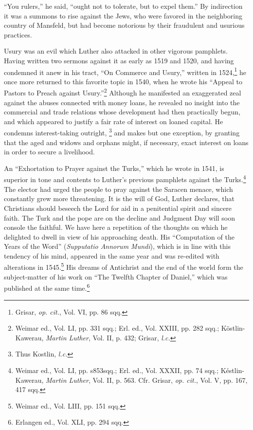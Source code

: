 “You rulers,” he said,
“ought not to tolerate, but to expel them.” By indirection it was a
summons to rise against the Jews, who were favored in the neighboring
country of Mansfeld, but had become notorious by their fraudulent
and usurious practices.

Usury was an evil which Luther also attacked in other vigorous
pamphlets. Having written two sermons against it as early as 1519
and 1520, and having condemned it anew in his tract, “On Commerce
and Usury,” written in 1524,\footnote{Grisar, \textit{op. cit.}, Vol. VI, pp. 86 sqq.}
he once more returned to this
favorite topic in 1540, when he wrote his “Appeal to Pastors to
Preach against Usury.”\footnote
{Weimar ed., Vol. LI, pp. 331 sqq.; Erl. ed., Vol. XXIII, pp. 282 sqq.; Köstlin-Kawerau,
\textit{Martin Luther}, Vol. II, p. 432; Grisar, \textit{l.c.}}
Although he manifested an exaggerated
zeal against the abuses connected with money loans, he revealed no
insight into the commercial and trade relations whose development
had then practically begun, and which appeared to justify a fair rate
of interest on loaned capital. He condemns interest-taking outright,
\footnote{Thus Kostlin, \textit{l.c.}}
and makes but one exception, by granting that the aged and widows
and orphans might, if necessary, exact interest on loans in order to
secure a livelihood.

An “Exhortation to Prayer against the Turks,” which he wrote in
1541, is superior in tone and contents to Luther’s previous pamphlets
against the Turks.\footnote
{Weimar ed., Vol. LI, pp. s853sqq.; Erl. ed., Vol. XXXII, pp. 74 sqq.; Késtlin-Kawerau,
\textit{Martin Luther}, Vol. II, p. 563. Cfr. Grisar, \textit{op. cit.}, Vol. V, pp. 167, 417 sqq.}
The elector had urged the people to pray against
the Saracen menace, which constantly grew more threatening. It is
the will of God, Luther declares, that Christians should beseech the
Lord for aid in a penitential spirit and sincere faith. The Turk and the
pope are on the decline and Judgment Day will soon console the faithful.
We have here a repetition of the thoughts on which he delighted
to dwell in view of his approaching death. His “Computation of the
Years of the Word” (\textit{Supputatio Annorum Mundi}), which is in line
with this tendency of his mind, appeared in the same year and was
re-edited with alterations in 1545.\footnote{Weimar ed., Vol. LIII, pp. 151 sqq.}
His dreams of Antichrist and the
end of the world form the subject-matter of his work on “The
Twelfth Chapter of Daniel,” which was published at the same time.\footnote{Erlangen ed., Vol. XLI, pp. 294 sqq.}

